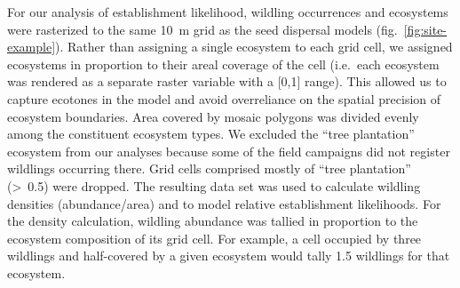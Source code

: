 \documentclass[
]{article}
\begin{document}
For our analysis of establishment likelihood, wildling occurrences and ecosystems were rasterized to the same 10~m grid as the seed dispersal models (fig.~\ref{fig:site-example}).
Rather than assigning a single ecosystem to each grid cell, we assigned ecosystems in proportion to their areal coverage of the cell (i.e.~each ecosystem was rendered as a separate raster variable with a {[}0,1{]} range).
This allowed us to capture ecotones in the model and avoid overreliance on the spatial precision of ecosystem boundaries.
Area covered by mosaic polygons was divided evenly among the constituent ecosystem types.
We excluded the ``tree plantation'' ecosystem from our analyses because some of the field campaigns did not register wildlings occurring there.
Grid cells comprised mostly of ``tree plantation'' (\textgreater~0.5) were dropped.
The resulting data set was used to calculate wildling densities (abundance/area) and to model relative establishment likelihoods.
For the density calculation, wildling abundance was tallied in proportion to the ecosystem composition of its grid cell.
For example, a cell occupied by three wildlings and half-covered by a given ecosystem would tally 1.5 wildlings for that ecosystem.
\end{document}
